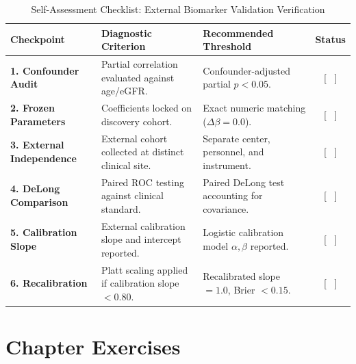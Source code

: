 \documentclass[11pt,twoside,openright]{book}
\begin{document}
\begin{table}[ht]
\centering
\caption{Self-Assessment Checklist: External Biomarker Validation Verification}
\label{tab:checklist_validation}
\small
\begin{tabularx}{\textwidth}{l p{5.5cm} X c}
\toprule
\textbf{Checkpoint} & \textbf{Diagnostic Criterion} & \textbf{Recommended Threshold} & \textbf{Status} \\
\midrule
\textbf{1. Confounder Audit} & Partial correlation evaluated against age/eGFR. & Confounder-adjusted partial $p < 0.05$. & [ \ ] \\
\addlinespace
\textbf{2. Frozen Parameters} & Coefficients locked on discovery cohort. & Exact numeric matching ($\Delta\beta = 0.0$). & [ \ ] \\
\addlinespace
\textbf{3. External Independence} & External cohort collected at distinct clinical site. & Separate center, personnel, and instrument. & [ \ ] \\
\addlinespace
\textbf{4. DeLong Comparison} & Paired ROC testing against clinical standard. & Paired DeLong test accounting for covariance. & [ \ ] \\
\addlinespace
\textbf{5. Calibration Slope} & External calibration slope and intercept reported. & Logistic calibration model $\alpha, \beta$ reported. & [ \ ] \\
\addlinespace
\textbf{6. Recalibration} & Platt scaling applied if calibration slope $< 0.80$. & Recalibrated slope $= 1.0$, Brier $< 0.15$. & [ \ ] \\
\bottomrule
\end{tabularx}
\end{table}

\FloatBarrier

\section{Chapter Exercises}
\end{document}
